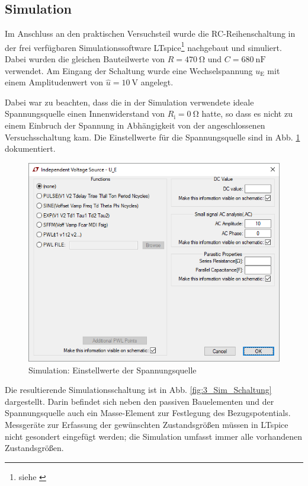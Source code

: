 \subsection{Simulation}
\label{subsec:3_Simulation}
%
Im Anschluss an den praktischen Versuchsteil wurde die RC-Reihenschaltung in der frei verfügbaren Simulationssoftware LTspice\footnote{siehe \cite{src:LTspice}} nachgebaut und simuliert. Dabei wurden die gleichen Bauteilwerte von $R = \SI{470}{\ohm}$ und $C = \SI{680}{\nano\farad}$ verwendet. Am Eingang der Schaltung wurde eine Wechselspannung $u_\mathrm{E}$ mit einem Amplitudenwert von $\hat{u} = \SI{10}{\volt} $ angelegt.
\par
Dabei war zu beachten, dass die in der Simulation verwendete ideale Spannungsquelle einen Innenwiderstand von $R_\mathrm{i} = \SI{0}{\ohm}$ hatte, so dass es nicht zu einem Einbruch der Spannung in Abhängigkeit von der angeschlossenen Versuchsschaltung kam. Die Einstellwerte für die Spannungsquelle sind in Abb. \ref{fig:3_Sim_Spannungsquelle} dokumentiert.
%
\begin{figure}[H]
  \centering
  \includegraphics[width=0.9\linewidth]{src/3_Sim_Spannungsquelle.png}
  \caption{Simulation: Einstellwerte der Spannungsquelle}
  \label{fig:3_Sim_Spannungsquelle}
\end{figure}
\par
Die resultierende Simulationsschaltung ist in Abb. \ref{fig:3_Sim_Schaltung} dargestellt. Darin befindet sich neben den passiven Bauelementen und der Spannungsquelle auch ein Masse-Element zur Festlegung des Bezugspotentials. Messgeräte zur Erfassung der gewünschten Zustandsgrößen müssen in LTspice nicht gesondert eingefügt werden; die Simulation umfasst immer alle vorhandenen Zustandsgrößen.

